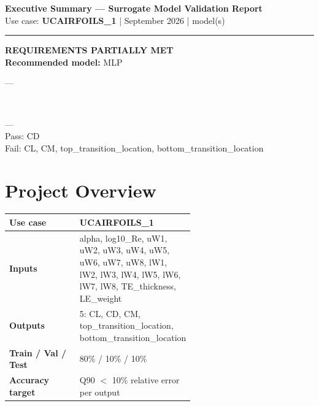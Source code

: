 \documentclass[9pt,a4paper]{article}
\begin{document}
\thispagestyle{fancy}

\begin{center}
  {\large\bfseries\color{primary} Executive Summary --- Surrogate Model Validation Report}\\[2pt]
  {\small\color{sepgray} Use case: \textbf{UCAIRFOILS\_1} \quad| September 2026 \quad| model(s)}
\end{center}
\vspace{-4pt}\noindent\rule{\linewidth}{1pt}\vspace{3pt}

\begin{center}
\colorbox{warnamber}{\begin{minipage}{0.66\linewidth}
  \vspace{5pt}\centering
  {\normalsize\bfseries REQUIREMENTS PARTIALLY MET}\\[4pt]
  {\small\bfseries Recommended model:} {\small MLP}\\[5pt]
\colorbox{r2green}{\begin{minipage}{0.97\linewidth}\vspace{2pt} \enspace---\vspace{2pt}\end{minipage}}\\[2pt]
\colorbox{warnamber}{\begin{minipage}{0.97\linewidth}\vspace{2pt} \enspace---\\[1pt]{\footnotesize Pass: CD}\\[1pt]{\footnotesize\color{red} Fail: CL, CM, top\_transition\_location, bottom\_transition\_location}\vspace{2pt}\end{minipage}}
  \vspace{5pt}
\end{minipage}}
\end{center}

\section{Project Overview}
\renewcommand{\arraystretch}{1.2}
\begin{tabular}{|l|p{0.60\linewidth}|}
  \hline
  \textbf{Use case}           & UCAIRFOILS\_1 \\ \hline
  \textbf{Inputs}             & alpha, log10\_Re, uW1, uW2, uW3, uW4, uW5, uW6, uW7, uW8, lW1, lW2, lW3, lW4, lW5, lW6, lW7, lW8, TE\_thickness, LE\_weight \\ \hline
  \textbf{Outputs}            & 5: CL, CD, CM, top\_transition\_location, bottom\_transition\_location \\ \hline
  \textbf{Train / Val / Test} & 80\% / 10\% / 10\% \\ \hline
  \textbf{Accuracy target}    & Q90 $<$ 10\% relative error per output \\ \hline
\end{tabular}
\end{document}
